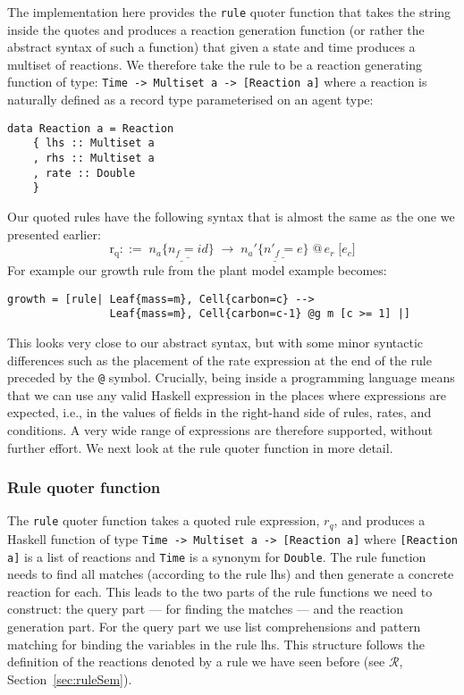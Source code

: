 \documentclass[phd]{infthesis}
\newcommand{\s}[1]{\underline{#1}}
\begin{document}
The implementation here provides the \texttt{rule} quoter function that takes
the string inside the quotes and produces a reaction generation function (or
rather the abstract syntax of such a function) that given a state and time
produces a multiset of reactions. We therefore take the rule to be a reaction
generating function of type: \texttt{Time -> Multiset a -> [Reaction a]} where a
reaction is naturally defined as a record type parameterised on an agent type:
\begin{center}
\begin{BVerbatim}
data Reaction a = Reaction
    { lhs :: Multiset a
    , rhs :: Multiset a
    , rate :: Double
    }
\end{BVerbatim}
\end{center}
Our quoted rules have the following syntax that is almost the same as the one we presented earlier:
$$\mathrm{r_q} ::= \; \s{n_a\{\s{n_f \mathbf{=} id}\}} \; \rightarrow \; \s{n_a'\{\s{n'_f \mathbf{=} e}\}} \; @\,e_r \; {[} e_c {]} $$                         
For example our growth rule from the plant model example becomes:
\begin{center}
\begin{BVerbatim}
growth = [rule| Leaf{mass=m}, Cell{carbon=c} -->
                Leaf{mass=m}, Cell{carbon=c-1} @g m [c >= 1] |]
\end{BVerbatim}
\end{center}
This looks very close to our abstract syntax, but with some minor syntactic
differences such as the placement of the rate expression at the end of the rule
preceded by the \texttt{@} symbol. Crucially, being inside a programming
language means that we can use any valid Haskell expression in the places where
expressions are expected, i.e., in the values of fields in the right-hand side
of rules, rates, and conditions. A very wide range of expressions are therefore
supported, without further effort. We next look at the rule quoter function in
more detail.

\subsubsection*{Rule quoter function}
The \texttt{rule} quoter function takes a quoted rule expression, $r_q$, and
produces a Haskell function of type \texttt{Time -> Multiset a -> [Reaction a]}
where \texttt{[Reaction a]} is a list of reactions and \texttt{Time} is a
synonym for \texttt{Double}. The rule function needs to find all matches
(according to the rule lhs) and then generate a concrete reaction for each.
This leads to the two parts of the rule functions we need to construct: the
query part --- for finding the matches --- and the reaction generation part. For
the query part we use list comprehensions and pattern matching for binding the
variables in the rule lhs. This structure follows the definition of the
reactions denoted by a rule we have seen before (see $\mathcal{R}$,
Section~\ref{sec:ruleSem}).
\end{document}
